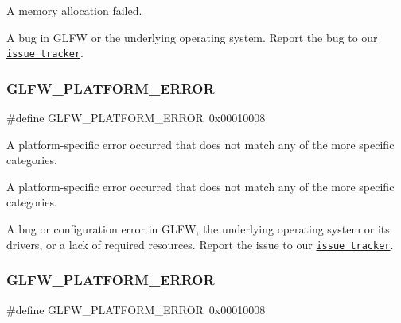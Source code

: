 A memory allocation failed.

A bug in G\+L\+FW or the underlying operating system. Report the bug to our \href{https://github.com/glfw/glfw/issues}{\tt issue tracker}. \mbox{\label{group__errors_gad44162d78100ea5e87cdd38426b8c7a1}} 
\subsubsection{\texorpdfstring{G\+L\+F\+W\+\_\+\+P\+L\+A\+T\+F\+O\+R\+M\+\_\+\+E\+R\+R\+OR}{GLFW\_PLATFORM\_ERROR}\hspace{0.1cm}{\footnotesize\ttfamily [1/5]}}
{\footnotesize\ttfamily \#define G\+L\+F\+W\+\_\+\+P\+L\+A\+T\+F\+O\+R\+M\+\_\+\+E\+R\+R\+OR~0x00010008}



A platform-\/specific error occurred that does not match any of the more specific categories. 

A platform-\/specific error occurred that does not match any of the more specific categories.

A bug or configuration error in G\+L\+FW, the underlying operating system or its drivers, or a lack of required resources. Report the issue to our \href{https://github.com/glfw/glfw/issues}{\tt issue tracker}. \mbox{\label{group__errors_gad44162d78100ea5e87cdd38426b8c7a1}} 
\subsubsection{\texorpdfstring{G\+L\+F\+W\+\_\+\+P\+L\+A\+T\+F\+O\+R\+M\+\_\+\+E\+R\+R\+OR}{GLFW\_PLATFORM\_ERROR}\hspace{0.1cm}{\footnotesize\ttfamily [2/5]}}
{\footnotesize\ttfamily \#define G\+L\+F\+W\+\_\+\+P\+L\+A\+T\+F\+O\+R\+M\+\_\+\+E\+R\+R\+OR~0x00010008}



